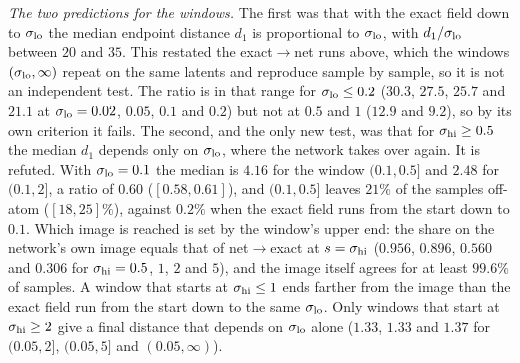 \documentclass{article} %
\theoremstyle{plain}
\theoremstyle{definition}
\theoremstyle{remark}
\begin{document}
\emph{The two predictions for the windows.} The first was that with the exact field down to
$\sigma_{\rm lo}$ the median endpoint distance $d_1$ is proportional to $\sigma_{\rm lo}$, with
$d_1/\sigma_{\rm lo}$ between $20$ and $35$. This restated the exact$\to$net runs above, which the
windows $(\sigma_{\rm lo},\infty)$ repeat on the same latents and reproduce sample by sample, so it
is not an independent test. The ratio is in that range for $\sigma_{\rm lo}\le0.2$ ($30.3$, $27.5$,
$25.7$ and $21.1$ at $\sigma_{\rm lo}=0.02$, $0.05$, $0.1$ and $0.2$) but not at $0.5$ and $1$
($12.9$ and $9.2$), so by its own criterion it fails. The second, and the only new test, was that
for $\sigma_{\rm hi}\ge0.5$ the median $d_1$ depends only on $\sigma_{\rm lo}$, where the network
takes over again. It is refuted. With $\sigma_{\rm lo}=0.1$ the median is $4.16$ for the window
$(0.1,0.5]$ and $2.48$ for $(0.1,2]$, a ratio of $0.60$ ($[0.58,0.61]$), and $(0.1,0.5]$ leaves
$21\%$ of the samples off-atom ($[18,25]\%$), against $0.2\%$ when the exact field runs from the
start down to $0.1$. Which image is reached is set by the window's upper end: the share on the
network's own image equals that of net$\to$exact at $s=\sigma_{\rm hi}$ ($0.956$, $0.896$, $0.560$
and $0.306$ for $\sigma_{\rm hi}=0.5$, $1$, $2$ and $5$), and the image itself agrees for at least
$99.6\%$ of samples. A window that starts at $\sigma_{\rm hi}\le1$ ends farther from the image than
the exact field run from the start down to the same $\sigma_{\rm lo}$. Only windows that start at
$\sigma_{\rm hi}\ge2$ give a final distance that depends on $\sigma_{\rm lo}$ alone ($1.33$, $1.33$
and $1.37$ for $(0.05,2]$, $(0.05,5]$ and $(0.05,\infty)$).
\end{document}
